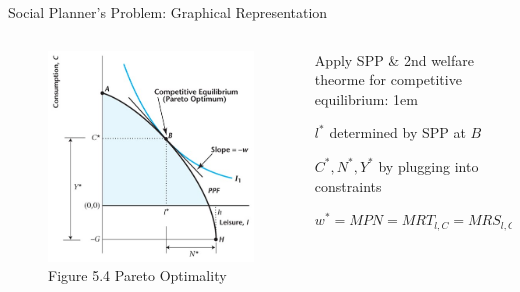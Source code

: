 \documentclass[11pt,aspectratio=43]{beamer}
\let\olditemize=\itemize
\let\endolditemize=\enditemize
\renewenvironment{itemize}{\olditemize \itemsep1em}{\endolditemize}
\theoremstyle{definition}
\begin{document}
\begin{frame}{Social Planner's Problem: Graphical Representation}
\label{slide:Social_Planner_s_Problem__Graphical_Representation}
    \begin{columns}
        \begin{column}{0.5\textwidth}
            \begin{figure}
                \caption{\scriptsize Figure 5.4  Pareto Optimality}
                \includegraphics[width=\textwidth]{./figures/Figure5_4.jpg}
            \end{figure}
        \end{column}
        \begin{column}{0.5\textwidth}
            Apply SPP \& 2nd welfare theorme for competitive equilibrium:
            \begin{itemize}
                \item $ l^{*} $ determined by SPP at $ B $
                \item $ C^{*}, N^{*}, Y^{*} $ by plugging into constraints
                \item $ w^{*} = MPN = MRT_{l, C} = MRS_{l, C} $
            \end{itemize}
        \end{column}
    \end{columns}
\end{frame}
\end{document}
